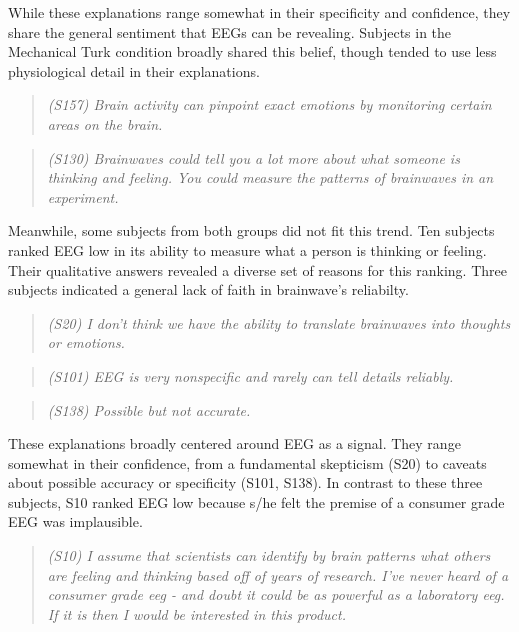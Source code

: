 \documentclass[sigconf]{acmart}
\begin{document}
While these explanations range somewhat in their specificity and confidence,
they share the general sentiment that EEGs can be revealing. Subjects in the Mechanical Turk condition broadly shared this belief, though tended to use less physiological detail in their explanations.

\begin{quote}
\emph{(S157) Brain activity can pinpoint exact emotions by monitoring certain areas on the brain.}
\end{quote}

\begin{quote}
\emph{(S130) Brainwaves could tell you a lot more about what someone is thinking and feeling. You could measure the patterns of brainwaves in an experiment.}
\end{quote}

Meanwhile, some subjects from both groups did not fit this trend. Ten subjects ranked EEG low in its ability to measure what a person is thinking or feeling. Their qualitative answers revealed a diverse set of reasons for this ranking.
Three subjects indicated a general lack of faith in brainwave's reliabilty.

\begin{quote}
\emph{(S20) I don't think we have the ability to translate brainwaves into thoughts or emotions.}
\end{quote}

\begin{quote}
\emph{(S101) EEG is very nonspecific and rarely can tell details reliably.}
\end{quote}

\begin{quote}
\emph{(S138) Possible but not accurate.}
\end{quote}

These explanations broadly centered around EEG as a signal.
They range somewhat in their confidence, from a fundamental skepticism (S20) to caveats about possible accuracy or specificity (S101, S138).
In contrast to these three subjects, S10 ranked EEG low because s/he
felt the premise of a consumer grade EEG was implausible.

\begin{quote}
\emph{(S10) I assume that scientists can identify by brain patterns what others are feeling and thinking based off of years of research.  I've never heard of a consumer grade eeg - and doubt it could be as powerful as a laboratory eeg.  If it is then I would be interested in this product.}
\end{quote}
\end{document}
